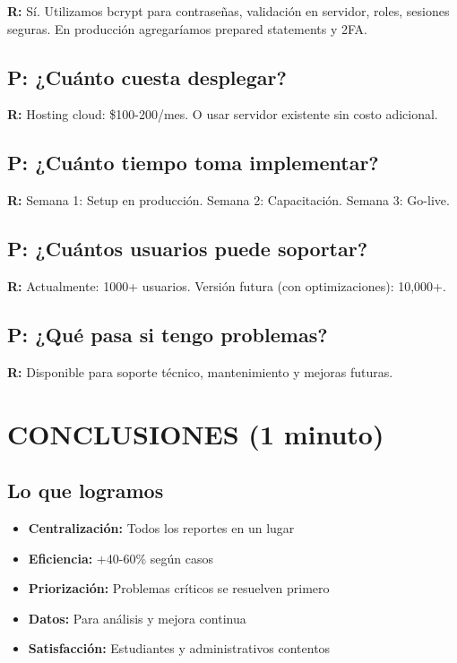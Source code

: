\documentclass[12pt, a4paper, spanish]{article}
\begin{document}
\textbf{R:} Sí. Utilizamos bcrypt para contraseñas, validación en servidor, roles, sesiones seguras. En producción agregaríamos prepared statements y 2FA.

\subsection{P: ¿Cuánto cuesta desplegar?}

\textbf{R:} Hosting cloud: \$100-200/mes. O usar servidor existente sin costo adicional.

\subsection{P: ¿Cuánto tiempo toma implementar?}

\textbf{R:} Semana 1: Setup en producción. Semana 2: Capacitación. Semana 3: Go-live.

\subsection{P: ¿Cuántos usuarios puede soportar?}

\textbf{R:} Actualmente: 1000+ usuarios. Versión futura (con optimizaciones): 10,000+.

\subsection{P: ¿Qué pasa si tengo problemas?}

\textbf{R:} Disponible para soporte técnico, mantenimiento y mejoras futuras.

\newpage

\section{CONCLUSIONES (1 minuto)}

\subsection{Lo que logramos}

\begin{tcolorbox}[colback=verde!10, colframe=verde!50, title=Resumen Ejecutivo]
\begin{itemize}
    \item[\checkmark] \textbf{Centralización:} Todos los reportes en un lugar
    \item[\checkmark] \textbf{Eficiencia:} +40-60\% según casos
    \item[\checkmark] \textbf{Priorización:} Problemas críticos se resuelven primero
    \item[\checkmark] \textbf{Datos:} Para análisis y mejora continua
    \item[\checkmark] \textbf{Satisfacción:} Estudiantes y administrativos contentos
\end{itemize}
\end{tcolorbox}
\end{document}
